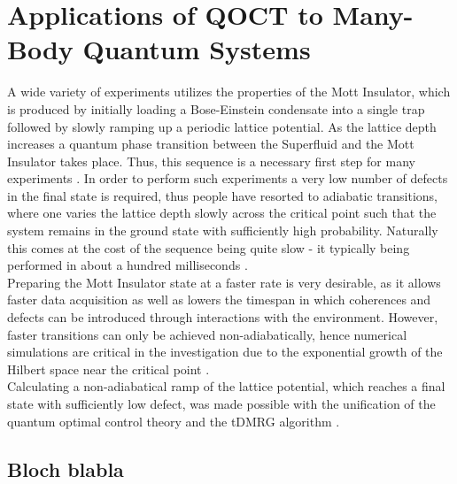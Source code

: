 \chapter{Applications of QOCT to Many-Body Quantum Systems}

A wide variety of experiments utilizes the properties of the Mott Insulator, which is produced by initially loading a Bose-Einstein condensate into a single trap followed by slowly ramping up a periodic lattice potential. As the lattice depth increases a quantum phase transition between the Superfluid and the Mott Insulator takes place. Thus, this sequence is a necessary first step for many experiments \cite{manybodyBloch}. In order to perform such experiments a very low number of defects in the final state is required, thus people have resorted to adiabatic transitions, where one varies the lattice depth slowly across the critical point such that the system remains in the ground state with sufficiently high probability. Naturally this comes at the cost of the sequence being quite slow - it typically being performed in about a hundred milliseconds \cite{JakschZoller}.\\
Preparing the Mott Insulator state at a faster rate is very desirable, as it allows faster data acquisition as well as lowers the timespan in which coherences and defects can be introduced through interactions with the environment. However, faster transitions can only be achieved non-adiabatically, hence numerical simulations are critical in the investigation due to the exponential growth of the Hilbert space near the critical point \cite{Vidal2003}.\\

Calculating a non-adiabatical ramp of the lattice potential, which reaches a final state with sufficiently low defect, was made possible with the unification of the quantum optimal control theory and the tDMRG algorithm \cite{Doria2011,FrankBloch}. 

\section{Bloch blabla}
